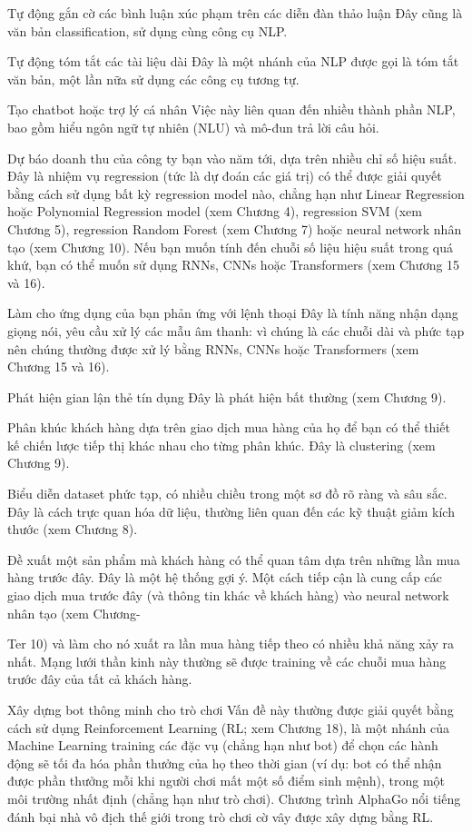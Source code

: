 Tự động gắn cờ các bình luận xúc phạm trên các diễn đàn thảo luận Đây cũng là văn bản classification, sử dụng cùng công cụ NLP.

Tự động tóm tắt các tài liệu dài Đây là một nhánh của NLP được gọi là tóm tắt văn bản, một lần nữa sử dụng các công cụ tương tự.

Tạo chatbot hoặc trợ lý cá nhân Việc này liên quan đến nhiều thành phần NLP, bao gồm hiểu ngôn ngữ tự nhiên (NLU) và mô-đun trả lời câu hỏi.

Dự báo doanh thu của công ty bạn vào năm tới, dựa trên nhiều chỉ số hiệu suất. Đây là nhiệm vụ regression (tức là dự đoán các giá trị) có thể được giải quyết bằng cách sử dụng bất kỳ regression model nào, chẳng hạn như Linear Regression hoặc Polynomial Regression model (xem Chương 4), regression SVM (xem Chương 5), regression Random Forest (xem Chương 7) hoặc neural network nhân tạo (xem Chương 10). Nếu bạn muốn tính đến chuỗi số liệu hiệu suất trong quá khứ, bạn có thể muốn sử dụng RNNs, CNNs hoặc Transformers (xem Chương 15 và 16).

Làm cho ứng dụng của bạn phản ứng với lệnh thoại Đây là tính năng nhận dạng giọng nói, yêu cầu xử lý các mẫu âm thanh: vì chúng là các chuỗi dài và phức tạp nên chúng thường được xử lý bằng RNNs, CNNs hoặc Transformers (xem Chương 15 và 16).

Phát hiện gian lận thẻ tín dụng Đây là phát hiện bất thường (xem Chương 9).

Phân khúc khách hàng dựa trên giao dịch mua hàng của họ để bạn có thể thiết kế chiến lược tiếp thị khác nhau cho từng phân khúc. Đây là clustering (xem Chương 9).

Biểu diễn dataset phức tạp, có nhiều chiều trong một sơ đồ rõ ràng và sâu sắc. Đây là cách trực quan hóa dữ liệu, thường liên quan đến các kỹ thuật giảm kích thước (xem Chương 8).

Đề xuất một sản phẩm mà khách hàng có thể quan tâm dựa trên những lần mua hàng trước đây. Đây là một hệ thống gợi ý. Một cách tiếp cận là cung cấp các giao dịch mua trước đây (và thông tin khác về khách hàng) vào neural network nhân tạo (xem Chương-

Ter 10) và làm cho nó xuất ra lần mua hàng tiếp theo có nhiều khả năng xảy ra nhất. Mạng lưới thần kinh này thường sẽ được training về các chuỗi mua hàng trước đây của tất cả khách hàng.

Xây dựng bot thông minh cho trò chơi Vấn đề này thường được giải quyết bằng cách sử dụng Reinforcement Learning (RL; xem Chương 18), là một nhánh của Machine Learning training các đặc vụ (chẳng hạn như bot) để chọn các hành động sẽ tối đa hóa phần thưởng của họ theo thời gian (ví dụ: bot có thể nhận được phần thưởng mỗi khi người chơi mất một số điểm sinh mệnh), trong một môi trường nhất định (chẳng hạn như trò chơi). Chương trình AlphaGo nổi tiếng đánh bại nhà vô địch thế giới trong trò chơi cờ vây được xây dựng bằng RL.

